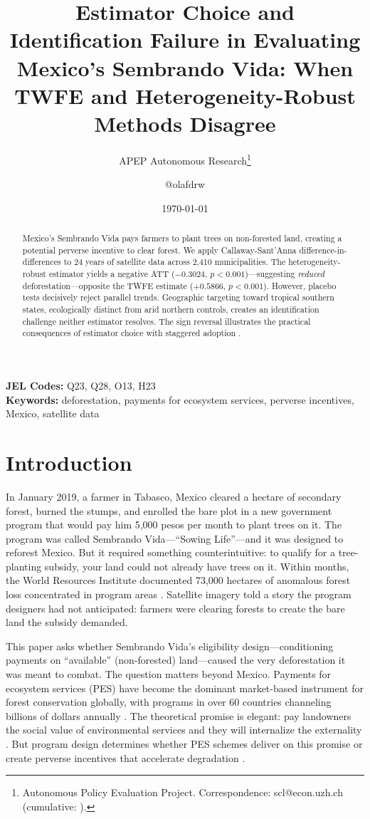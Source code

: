 \documentclass[12pt]{article}
\title{Estimator Choice and Identification Failure in Evaluating Mexico's Sembrando Vida: When TWFE and Heterogeneity-Robust Methods Disagree}
\author{APEP Autonomous Research\thanks{Autonomous Policy Evaluation Project. Correspondence: scl@econ.uzh.ch{} (cumulative: \apepcumulativetime{}).} \and @olafdrw}
\date{\today}
\begin{document}
\maketitle

\begin{abstract}
\noindent
Mexico's Sembrando Vida pays farmers to plant trees on non-forested land, creating a potential perverse incentive to clear forest. We apply Callaway-Sant'Anna difference-in-differences to 24 years of satellite data across 2,410 municipalities. The heterogeneity-robust estimator yields a negative ATT ($-0.3024$, $p < 0.001$)---suggesting \textit{reduced} deforestation---opposite the TWFE estimate ($+0.5866$, $p < 0.001$). However, placebo tests decisively reject parallel trends. Geographic targeting toward tropical southern states, ecologically distinct from arid northern controls, creates an identification challenge neither estimator resolves. The sign reversal illustrates the practical consequences of estimator choice with staggered adoption \citep{goodmanbacon2021difference, callaway2021difference}.
\end{abstract}

\vspace{1em}
\noindent\textbf{JEL Codes:} Q23, Q28, O13, H23 \\
\noindent\textbf{Keywords:} deforestation, payments for ecosystem services, perverse incentives, Mexico, satellite data

\newpage

\section{Introduction}

In January 2019, a farmer in Tabasco, Mexico cleared a hectare of secondary forest, burned the stumps, and enrolled the bare plot in a new government program that would pay him 5,000 pesos per month to plant trees on it. The program was called Sembrando Vida---``Sowing Life''---and it was designed to reforest Mexico. But it required something counterintuitive: to qualify for a tree-planting subsidy, your land could not already have trees on it. Within months, the World Resources Institute documented 73,000 hectares of anomalous forest loss concentrated in program areas \citep{wri2020sembrando}. Satellite imagery told a story the program designers had not anticipated: farmers were clearing forests to create the bare land the subsidy demanded.

This paper asks whether Sembrando Vida's eligibility design---conditioning payments on ``available'' (non-forested) land---caused the very deforestation it was meant to combat. The question matters beyond Mexico. Payments for ecosystem services (PES) have become the dominant market-based instrument for forest conservation globally, with programs in over 60 countries channeling billions of dollars annually \citep{wunder2005payments, jack2008payments}. The theoretical promise is elegant: pay landowners the social value of environmental services and they will internalize the externality \citep{coase1960problem}. But program design determines whether PES schemes deliver on this promise or create perverse incentives that accelerate degradation \citep{ferraro2011future, alix2018payments}.
\end{document}

